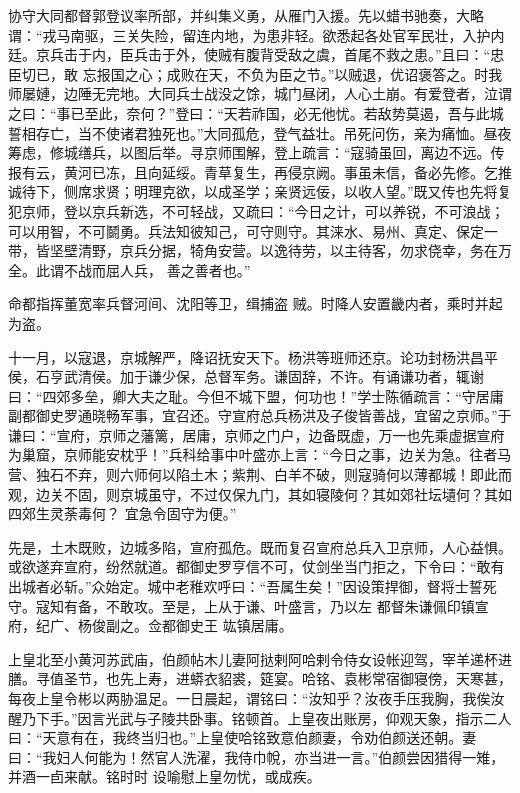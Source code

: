 \documentclass{article}
\begin{document}
协守大同都督郭登议率所部，并纠集义勇，从雁门入援。先以蜡书驰奏，大略谓：“戎马南驱，三关失险，留连内地，为患非轻。欲悉起各处官军民壮，入护内廷。京兵击于内，臣兵击于外，使贼有腹背受敌之虞，首尾不救之患。”且曰：“忠臣切已，敢
\newpage
忘报国之心；成败在天，不负为臣之节。”以贼退，优诏褒答之。时我师屡㜕，边陲无完地。大同兵士战没之馀，城门昼闭，人心土崩。有爱登者，泣谓之曰：“事已至此，奈何？”登曰：“天若祚国，必无他忧。若敌势莫遏，吾与此城誓相存亡，当不使诸君独死也。”大同孤危，登气益壮。吊死问伤，亲为痛恤。昼夜筹虑，修城缮兵，以图后举。寻京师围解，登上疏言：“寇骑虽回，离边不远。传报有云，黄河已冻，且向延绥。青草复生，再侵京阙。事虽未信，备必先修。乞推诚待下，侧席求贤；明理克欲，以成圣学；亲贤远佞，以收人望。”既又传也先将复犯京师，登以京兵新选，不可轻战，又疏曰：“今日之计，可以养锐，不可浪战；可以用智，不可鬬勇。兵法知彼知己，可守则守。其涞水、易州、真定、保定一带，皆坚壁清野，京兵分据，犄角安营。以逸待劳，以主待客，勿求侥幸，务在万全。此谓不战而屈人兵，
善之善者也。” 

命都指挥董宽率兵督河间、沈阳等卫，缉捕盗
贼。时降人安置畿内者，乘时并起为盗。 

\newpage

十一月，以寇退，京城解严，降诏抚安天下。杨洪等班师还京。论功封杨洪昌平侯，石亨武清侯。加于谦少保，总督军务。谦固辞，不许。有诵谦功者，辄谢曰：“四郊多垒，卿大夫之耻。今但不城下盟，何功也！”学士陈循疏言：“守居庸副都御史罗通晓畅军事，宜召还。守宣府总兵杨洪及子俊皆善战，宜留之京师。”于谦曰：“宣府，京师之藩篱，居庸，京师之门户，边备既虚，万一也先乘虚据宣府为巢窟，京师能安枕乎！”兵科给事中叶盛亦上言：“今日之事，边关为急。往者马营、独石不弃，则六师何以陷土木；紫荆、白羊不破，则寇骑何以薄都城！即此而观，边关不固，则京城虽守，不过仅保九门，其如寝陵何？其如郊社坛壝何？其如四郊生灵荼毒何？
宜急令固守为便。” 

先是，土木既败，边城多陷，宣府孤危。既而复召宣府总兵入卫京师，人心益惧。或欲遂弃宣府，纷然就道。都御史罗亨信不可，仗剑坐当门拒之，下令曰：“敢有出城者必斩。”众始定。城中老稚欢呼曰：“吾属生矣！”因设策捍御，督将士誓死守。寇知有备，不敢攻。至是，上从于谦、叶盛言，乃以左
\newpage
都督朱谦佩印镇宣府，纪广、杨俊副之。佥都御史王
竑镇居庸。 

上皇北至小黄河苏武庙，伯颜帖木儿妻阿挞剌阿哈剌令侍女设帐迎驾，宰羊递杯进膳。寻值圣节，也先上寿，进蟒衣貂裘，筵宴。哈铭、袁彬常宿御寝傍，天寒甚，每夜上皇令彬以两胁温足。一日晨起，谓铭曰：“汝知乎？汝夜手压我胸，我俟汝醒乃下手。”因言光武与子陵共卧事。铭顿首。上皇夜出账房，仰观天象，指示二人曰：“天意有在，我终当归也。”上皇使哈铭致意伯颜妻，令劝伯颜送还朝。妻曰：“我妇人何能为！然官人洗濯，我侍巾帨，亦当进一言。”伯颜尝因猎得一雉，并酒一卣来献。铭时时
设喻慰上皇勿忧，或成疾。 
\end{document}

